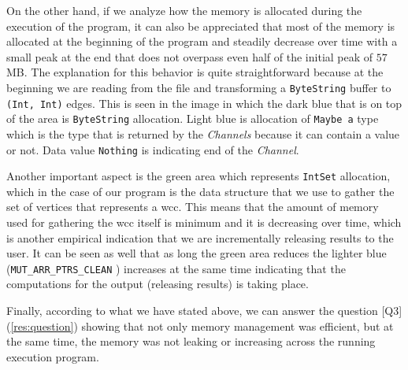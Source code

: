   On the other hand, if we analyze how the memory is allocated during the execution of the program, it can also be appreciated that most of the memory is allocated at the beginning of the program and steadily decrease over time with a small peak at the end that does not overpass even half of the initial peak of $57$ MB. The explanation for this behavior is quite straightforward because at the beginning we are reading from the file and transforming a \texttt{ByteString} buffer to \texttt{(Int, Int)} edges. This is seen in the image in which the dark blue that is on top of the area is \texttt{ByteString} allocation. Light blue is allocation of \texttt{Maybe a} type which is the type that is returned by the \textit{Channels} because it can contain a value or not. Data value \texttt{Nothing} is indicating end of the \textit{Channel}. 
  
  Another important aspect is the green area which represents \texttt{IntSet} allocation, which in the case of our program is the data structure that we use to gather the set of vertices that represents a \acrshort{wcc}. This means that the amount of memory used for gathering the \acrshort{wcc} itself is minimum and it is decreasing over time, which is another empirical indication that we are incrementally releasing results to the user. It can be seen as well that as long the green area reduces the lighter blue (\texttt{MUT_ARR_PTRS_CLEAN} \cite{ghcheap}) increases at the same time indicating that the computations for the output (releasing results) is taking place. 
  
  Finally, according to what we have stated above, we can answer the question [Q3] (\autoref{res:question}) showing that not only memory management was efficient, but at the same time, the memory was not leaking or increasing across the running execution program.
  
  
  